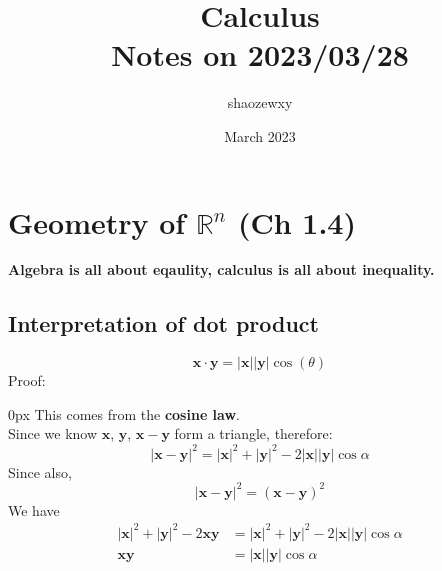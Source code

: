 \documentclass{article}
\title{Calculus\\
\large{Notes on 2023/03/28}}
\author{shaozewxy }
\date{March 2023}
\begin{document}
\maketitle

\section{Geometry of $\mathbb{R}^n$ (Ch 1.4)}
\textbf{Algebra is all about eqaulity, calculus is all about inequality.}
\subsection{Interpretation of dot product}

\begin{equation*}
    \mathbf{x} \cdot \mathbf{y} = |\mathbf{x}||\mathbf{y}| \cos(\theta) \tag{1.4.3}
\end{equation*}
Proof:
\begin{addmargin}[10px]{0px}
    This comes from the \textbf{cosine law}.\\
    Since we know $\mathbf{x}$, $\mathbf{y}$, $\mathbf{x}-\mathbf{y}$ form a triangle, therefore:
    \begin{equation*}
        |\mathbf{x} - \mathbf{y}|^2 = |\mathbf{x}|^2 + |\mathbf{y}|^2 - 2 |\mathbf{x}| |\mathbf{y}| \cos \alpha
    \end{equation*}
    Since also,
    \begin{equation*}
        |\mathbf{x} - \mathbf{y}|^2 = (\mathbf{x} - \mathbf{y})^2
    \end{equation*}
    We have
    \begin{equation*}
        \begin{split}
            |\mathbf{x}|^2 + |\mathbf{y}|^2 - 2 \mathbf{x}\mathbf{y} &= |\mathbf{x}|^2 + |\mathbf{y}|^2 - 2 |\mathbf{x}| |\mathbf{y}| \cos \alpha\\
            \mathbf{x}\mathbf{y} &= |\mathbf{x}||\mathbf{y}|\cos \alpha
        \end{split}
    \end{equation*}
\end{addmargin}
\end{document}
